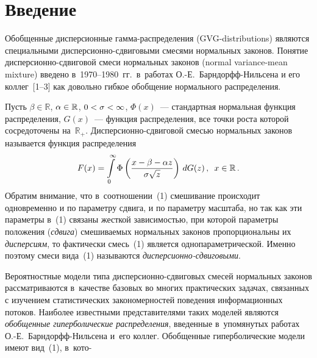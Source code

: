 

\vspace*{3pt}


\thispagestyle{headings}

\begin{multicols}{2}

\label{st\stat}

\section{Введение}

Обобщенные дисперсионные гам\-ма-рас\-пре\-де\-ле\-ния (GVG-distributions)
являются специальными дисперсионно-сдвиговыми смесями нормальных
законов. Понятие дис\-пер\-си\-он\-но-сдви\-го\-вой смеси нормальных законов
(normal variance-mean mixture) введено в~1970--1980~гг.\ 
в~работах \mbox{О.-Е.}~Барн\-дорфф-Ниль\-се\-на и его
коллег~[1--3] как довольно гибкое обобщение нормального распределения.

Пусть $\beta\in\mathbb{R}$, $\alpha\hm\in\mathbb{R}$,
$0\hm<\sigma\hm<\infty$, $\Phi(x)$~--- стандартная нормальная функция
распределения, $G(x)$~--- функция распределения, все точки роста
которой сосредоточены на~$\mathbb{R}_+$. Дис\-пер\-си\-он\-но-сдви\-го\-вой
смесью нормальных законов называется функция распределения
\begin{equation}
F(x)=\int\limits_{0}^{\infty}\Phi\left(\displaystyle\frac{\displaystyle x-\beta-\alpha
z\mathstrut}{\displaystyle \sigma\sqrt{z}\mathstrut}\right)\,dG(z)\,,\enskip x\in \mathbb{R}\,.
\label{e1-kk}
\end{equation}
Обратим внимание, что в~соотношении~(1) смешивание происходит
одновременно и по параметру сдвига, и по параметру масштаба, но так
как эти параметры в~(1) связаны жесткой зависимостью, при которой
параметры положения ({\it сдвига}) смешиваемых нормальных законов
пропорциональны их {\it дисперсиям}, то фактически смесь~(1)
является однопараметрической. Именно поэтому смеси вида~(1)
называются {\it дис\-пер\-си\-он\-но-сдви\-го\-выми}.

Вероятностные модели типа дис\-пер\-си\-он\-но-сдви\-го\-вых смесей нормальных
законов рассматриваются в~качестве базовых во многих практических
задачах, связанных с изучением статистических закономерностей
поведения информационных потоков. Наиболее известными
представителями таких моделей являются {\it обобщенные
гиперболические распределения}, введенные в~упомянутых работах 
\mbox{О.-Е.}~Барн\-дорфф-Ниль\-се\-на 
и~его коллег. Обобщенные гиперболические модели
имеют вид~(1), в~кото-\linebreak\vspace*{-12pt}


\end{multicols}
